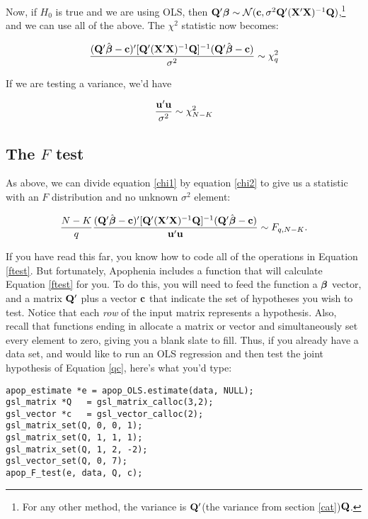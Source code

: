 Now, if $H_0$ is true and we are using OLS, then ${\bf Q}' {\mbox{\boldmath$\beta$}} \sim {\cal
N}({\bf c}, \sigma^2 {\bf Q}' ({\bf X}'{\bf X})^{-1} {\bf Q})$,\footnote{For any other
method, the variance is ${\bf Q}'$(the variance from section
\ref{cat})${\bf Q}$.} and we can use all of the above. The $\chi^2$
statistic now becomes:

\begin{equation}		\label{chi1}
{({\bf Q}'\hat{{\mbox{\boldmath$\beta$}}}- {\bf c})' [{\bf Q}' ({\bf X}'{\bf X})^{-1} {\bf Q}]^{-1} ({\bf Q}' \hat{{\mbox{\boldmath$\beta$}}}- {\bf c})
\over \sigma^2} \sim \chi^2_q
\end{equation}

If we are testing a variance, we'd have 

\begin{equation}		\label{chi2}
{{\bf u}' {\bf u} \over \sigma^2} \sim \chi^2_{N-K}
\end{equation}


\subsection{The $F$ test}\label{ftestsec}

As above, we can divide equation \ref{chi1} by equation \ref{chi2}
to give us a statistic with an $F$ distribution and no unknown
$\sigma^2$ element:

\begin{equation}	
{N-K\over q}
{({\bf Q}'\hat{{\mbox{\boldmath$\beta$}}}- {\bf c})' [{\bf Q}' ({\bf X}'{\bf X})^{-1} {\bf Q}]^{-1} ({\bf Q}' \hat{{\mbox{\boldmath$\beta$}}}- {\bf c})
\over {\bf u}' {\bf u}} \sim F_{q,N-K}. \label{ftest}
\end{equation}	

If you have read this far, you know how to code all of the operations
in Equation \ref{ftest}.  But fortunately, 
Apophenia includes a function that will calculate Equation \ref{ftest}
for you.
To do this, you will need to feed the function a ${\mbox{\boldmath$\beta$}}$ vector, and a
matrix ${\bf Q}'$ plus a vector ${\bf c}$ that indicate the set of hypotheses
you wish to test. Notice that each {\em row} of the input matrix represents a
hypothesis. Also, recall that functions ending in  allocate
a matrix or vector and simultaneously set every element to zero, giving
you a blank slate to fill. Thus, if you already have a data set, and
would like to run an OLS regression and then test the joint hypothesis
of Equation \ref{qc}, here's what you'd type:
\begin{lstlisting}
apop_estimate *e = apop_OLS.estimate(data, NULL);
gsl_matrix *Q   = gsl_matrix_calloc(3,2);
gsl_vector *c   = gsl_vector_calloc(2);
gsl_matrix_set(Q, 0, 0, 1);
gsl_matrix_set(Q, 1, 1, 1);
gsl_matrix_set(Q, 1, 2, -2);
gsl_vector_set(Q, 0, 7);
apop_F_test(e, data, Q, c);
\end{lstlisting}

